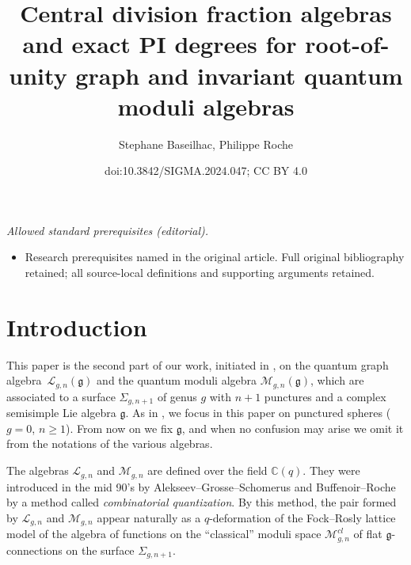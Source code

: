 \documentclass[10pt,a4paper]{amsart}
\title{Central division fraction algebras and exact PI degrees for root-of-unity graph and invariant quantum moduli algebras}
\author{Stephane Baseilhac, Philippe Roche}
\date{doi:10.3842/SIGMA.2024.047; CC BY 4.0}
\numberwithin{equation}{section}
\theoremstyle{definition}
\newcommand{\mc}{\mathbb{C}}
\newcommand{\Ll}{{\mathcal L}}
\newcommand{\Mm}{{\mathcal M}}
\begin{document}
\maketitle
\noindent\textit{Allowed standard prerequisites (editorial).}\begin{itemize}
\item Research prerequisites named in the original article. Full original bibliography retained; all source-local definitions and supporting arguments retained.
\end{itemize}\medskip
\section{Introduction}\label{INTRO}

This paper is the second part of our work, initiated in \cite{BR}, on the quantum graph algebra~$\Ll_{g,n}(\mathfrak{g})$ and the quantum moduli algebra $\Mm_{g,n}(\mathfrak{g})$, which are associated to a surface $\Sigma_{g,n+1}$ of genus $g$ with $n+1$ punctures and a complex semisimple Lie algebra $\mathfrak{g}$. As in \cite{BR}, we focus in this paper on punctured spheres ($g=0$, $n\geq 1$). From now on we fix $\mathfrak{g}$, and when no confusion may arise we omit it from the notations of the various algebras.

The algebras $\Ll_{g,n}$ and $\Mm_{g,n}$ are defined over the field $\mc(q)$. They were introduced in the mid 90's by Alekseev--Grosse--Schomerus \cite{AGS1,AGS2} and Buffenoir--Roche \cite{BR1,BR2} by a method called {\it combinatorial quantization}. By this method, the pair formed by $\Ll_{g,n}$ and $\Mm_{g,n}$ appear naturally as a $q$-deformation of the Fock--Rosly \cite{FR} lattice model of the algebra of functions on the ``classical'' moduli space $\Mm_{g,n}^{cl}$ of flat $\mathfrak{g}$-connections on the surface $\Sigma_{g,n+1}$.
\end{document}
